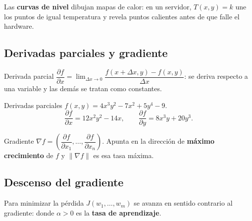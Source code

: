 \begin{center}
\end{center}

\begin{tmsistemas}
Las \textbf{curvas de nivel} dibujan mapas de calor: en un servidor, $T(x, y)=k$ une los puntos de igual temperatura y revela puntos calientes antes de que falle el hardware.
\end{tmsistemas}

\subsection{Derivadas parciales y gradiente}
\begin{tmdef}{Derivada parcial}
$\dfrac{\partial f}{\partial x}=\lim_{\Delta x\to0}\dfrac{f(x+\Delta x, y)-f(x, y)}{\Delta x}$: se deriva respecto a una variable y las dem\'as se tratan como constantes.
\end{tmdef}

\begin{tmejemplo}{Derivadas parciales}
$f(x, y)=4x^3y^2-7x^2+5y^4-9$.
\[\frac{\partial f}{\partial x}=12x^2y^2-14x,\qquad\frac{\partial f}{\partial y}=8x^3y+20y^3.\]
\end{tmejemplo}

\begin{tmdef}{Gradiente}
$\nabla f=\left(\dfrac{\partial f}{\partial x_1},\dots,\dfrac{\partial f}{\partial x_n}\right)$. Apunta en la direcci\'on de \textbf{m\'aximo crecimiento} de $f$ y $\|\nabla f\|$ es esa tasa m\'axima.
\end{tmdef}

\subsection{Descenso del gradiente}
Para minimizar la p\'erdida $J(w_1,\dots,w_m)$ se avanza en sentido contrario al gradiente:
donde $\alpha>0$ es la \textbf{tasa de aprendizaje}.

